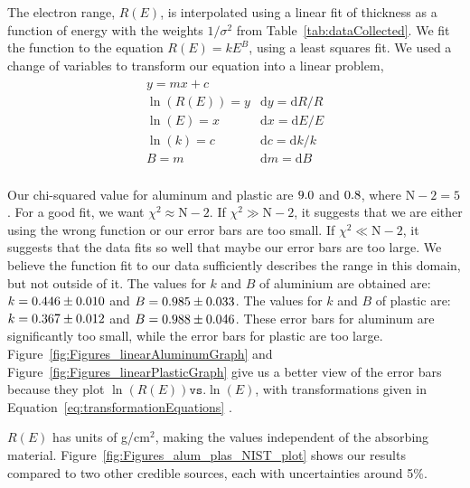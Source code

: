 The electron range, $R(E)$, is interpolated using a linear fit of thickness as a function of energy with the weights $1/\sigma^2$ from Table~\ref{tab:dataCollected}. We fit the function to the equation $R(E)=kE^B$, using a least squares fit.  We used a change of variables to transform our equation into a linear problem,
\begin{align}
	\begin{matrix}
		y = m x + c 	 						\\
		\ln(R(E)) = y 	& 	\mathrm{d}y = \mathrm{d}R/R				\\
		\ln(E) = x 		& 	\mathrm{d}x = \mathrm{d}E/E				\\
		\ln(k) = c 		& 	\mathrm{d}c = \mathrm{d}k/k				\\
		B = m 			& 	\mathrm{d}m = \mathrm{d}B				\\
	\end{matrix}
	\label{eq:transformationEquations}
\end{align}


 Our chi-squared value for aluminum and plastic are $9.0$ and $0.8$, where $\text{N}-2 =5$.  For a good fit, we want $\chi^2\approx \text{N}-2$.  If $\chi^2 \gg \text{N}-2$, it suggests that we are either using the wrong function or our error bars are too small.  If $\chi^2 \ll \text{N}-2$, it suggests that the data fits so well that maybe our error bars are too large.\cite{garcia2000numerical}  We believe the function fit to our data sufficiently describes the range in this domain, but not outside of it.  
 The values for $k$ and $B$ of aluminium are obtained are: $k = 0.446 \pm 0.010$ and $B = 0.985 \pm 0.033$. The values for $k$ and $B$ of plastic are: $k = 0.367 \pm 0.012$ and $B = 0.988 \pm 0.046$.  These error bars for aluminum are significantly too small, while the error bars for plastic are too large.  Figure~\ref{fig:Figures_linearAluminumGraph} and Figure~\ref{fig:Figures_linearPlasticGraph} give us a better view of the error bars because they plot $\ln(R(E))\mathtt{ vs. } \ln(E)$, with transformations given in Equation~\eqref{eq:transformationEquations} .

 $R(E)$ has units of g/cm$^2$, making the values independent of the absorbing material. Figure~\ref{fig:Figures_alum_plas_NIST_plot} shows our results compared to two other credible sources\cite{RevModPhys.24.28,nistData}, each with uncertainties around 5\%.  

